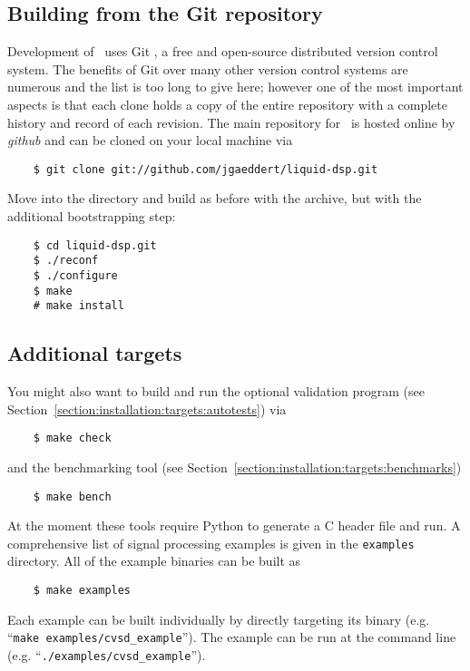 \subsection{Building from the Git repository}
\label{section:quickstart:build_from_git}
Development of \liquid\ uses Git \cite{git:web}, a free and
open-source distributed version control system.
The benefits of Git over many other version control systems are
numerous and the list is too long to give here;
however one of the most important aspects is that each clone holds a
copy of the entire repository with a complete history and record of each
revision.
The main repository for \liquid\ is hosted online by {\em github}
\cite{github:web} and can be cloned on your local machine via
%
\begin{verbatim}
    $ git clone git://github.com/jgaeddert/liquid-dsp.git
\end{verbatim}
%
Move into the directory and build as before with the archive,
but with the additional bootstrapping step:
%
\begin{verbatim}
    $ cd liquid-dsp.git
    $ ./reconf
    $ ./configure
    $ make
    # make install
\end{verbatim}

\subsection{Additional targets}
\label{section:quickstart:additional_targets}
%
You might also want to build and run the optional validation program
(see Section~\ref{section:installation:targets:autotests}) via
\begin{verbatim}
    $ make check
\end{verbatim}
and the benchmarking tool
(see Section~\ref{section:installation:targets:benchmarks})
\begin{verbatim}
    $ make bench
\end{verbatim}
%
At the moment these tools require Python \cite{python:web} to generate a
C header file and run.
A comprehensive list of signal processing examples is given in the
{\tt examples} directory.
All of the example binaries can be built as
\begin{verbatim}
    $ make examples
\end{verbatim}
%
Each example can be built individually by directly targeting its binary
(e.g. ``{\tt make examples/cvsd\_example}'').
The example can be run at the command line
(e.g. ``{\tt ./examples/cvsd\_example}'').


